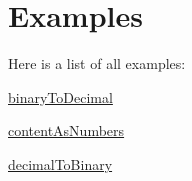 \section{Examples}
Here is a list of all examples\+:\begin{DoxyCompactItemize}
\item 
\hyperlink{binary_to_decimal-example}{binary\+To\+Decimal}
\item 
\hyperlink{content_as_numbers-example}{content\+As\+Numbers}
\item 
\hyperlink{decimal_to_binary-example}{decimal\+To\+Binary}
\end{DoxyCompactItemize}
